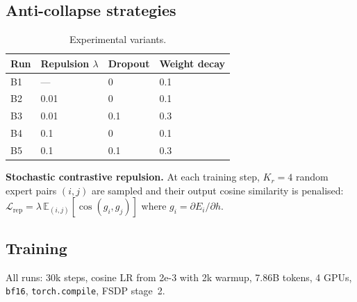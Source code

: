 \documentclass[11pt,a4paper]{article}
\begin{document}
\begin{table}[ht]
\centering
\caption{Parameter breakdown.  All counts in millions.  FFN:Attn = ratio of FFN
  to attention parameters (excluding embedding and projections).}
\label{tab:params}
\small
{}
\end{table}

\subsection{Anti-collapse strategies}

\begin{table}[h]
\centering
\caption{Experimental variants.}
\label{tab:variants}
\begin{tabular}{llll}
\toprule
Run & Repulsion $\lambda$ & Dropout & Weight decay \\
\midrule
B1 & --- & 0 & 0.1 \\
B2 & 0.01 & 0 & 0.1 \\
B3 & 0.01 & 0.1 & 0.3 \\
B4 & 0.1  & 0   & 0.1 \\
B5 & 0.1  & 0.1 & 0.3 \\
\bottomrule
\end{tabular}
\end{table}

\noindent\textbf{Stochastic contrastive repulsion.}
At each training step, $K_r{=}4$ random expert pairs $(i,j)$ are sampled and
their output cosine similarity is penalised:
$\mathcal{L}_\text{rep} = \lambda\,\mathbb{E}_{(i,j)}[\cos(g_i,g_j)]$
where $g_i = \partial E_i/\partial h$.

\subsection{Training}
All runs: 30k steps, cosine LR from 2e-3 with 2k warmup, 7.86B tokens,
4 GPUs, \texttt{bf16}, \texttt{torch.compile}, FSDP stage~2.
\end{document}
